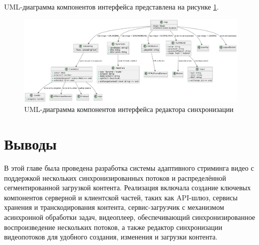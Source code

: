 	UML-диаграмма компонентов интерфейса представлена на рисунке \ref{fig:uml_sync}.

	\begin{figure}[ht!] 
		\center
		\includegraphics [scale=0.25] {my_folder/images//uml_sync}
		\caption{UML-диаграмма компонентов интерфейса редактора синхронизации} 
		\label{fig:uml_sync}  
	\end{figure}

\section{Выводы}

	В этой главе была проведена разработка системы адаптивного стриминга видео с поддержкой нескольких синхронизированных потоков и распределённой сегментированной загрузкой контента. Реализация включала создание ключевых компонентов серверной и клиентской частей, таких как API-шлюз, сервисы хранения и транскодирования контента, сервис-загрузчик с механизмом асинхронной обработки задач, видеоплеер, обеспечивающий синхронизированное воспроизведение нескольких потоков, а также редактор синхронизации видеопотоков для удобного создания, изменения и загрузки контента.
	